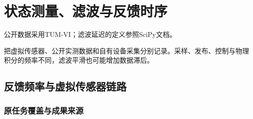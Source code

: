 \chapter{状态测量、滤波与反馈时序}
公开数据采用TUM-VI\cite{tumvi}；滤波延迟的定义参照SciPy文档\cite{scipy}。


把虚拟传感器、公开实测数据和自有设备采集分别记录。采样、发布、控制与物理积分的频率不同，滤波平滑也可能增加数据滞后。

\section{反馈频率与虚拟传感器链路}

\label{stage:s05}

\subsection{原任务覆盖与成果来源}\label{s05-detail-1}

